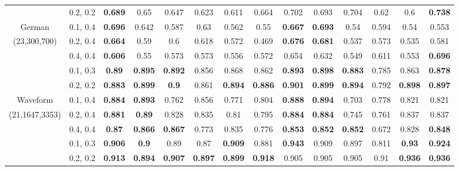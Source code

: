 \begin{table}[ht]
\begin{tabular}{|c|c|c|c|c|c|c|c|c|c|c|c|c|c|}
               & 0.2, 0.2   & \textbf{0.689} & 0.65      & 0.647     & 0.623 & 0.611 & 0.664 
               & 0.702 & 0.693     & 0.704     & 0.62  & 0.6   & \textbf{0.738} \\
German         & 0.1, 0.4   & \textbf{0.696} & 0.642     & 0.587     & 0.63  & 0.562 & 0.55  
               & \textbf{0.667} & \textbf{0.693}     & 0.54      & 0.594 & 0.54  & 0.553 \\
(23,300,700)   & 0.2, 0.4   & \textbf{0.664} & 0.59      & 0.6       & 0.618 & 0.572 & 0.469 
               & \textbf{0.676} & \textbf{0.681}     & 0.537     & 0.573 & 0.535 & 0.581 \\
               & 0.4, 0.4   & \textbf{0.606} & 0.55      & 0.573     & 0.573 & 0.556 & 0.572 
               & 0.654 & 0.632     & 0.549     & 0.611 & 0.553 & \textbf{0.696} \\ \hline
               & 0.1, 0.3   & \textbf{0.89}  & \textbf{0.895}     & \textbf{0.892}     & 0.856 & 0.868 & 0.862 
               & \textbf{0.893} & \textbf{0.898}     & \textbf{0.883}     & 0.785 & 0.863 & \textbf{0.878} \\ 
               & 0.2, 0.2   & \textbf{0.883} & \textbf{0.899}     & \textbf{0.9}       & 0.861 & \textbf{0.894} & \textbf{0.886} 
               & \textbf{0.901} & \textbf{0.899}     & \textbf{0.894}     & 0.792 & \textbf{0.898} & \textbf{0.897} \\
Waveform       & 0.1, 0.4   & \textbf{0.884} & \textbf{0.893}     & 0.762     & 0.856 & 0.771 & 0.804 
               & \textbf{0.888} & \textbf{0.894}     & 0.703     & 0.778 & 0.821 & 0.821 \\
(21,1647,3353) & 0.2, 0.4   & \textbf{0.881} & \textbf{0.89}      & 0.828     & 0.835 & 0.81  & 0.795 
               & \textbf{0.884} & \textbf{0.884}     & 0.745     & 0.761 & 0.837 & 0.837 \\
               & 0.4, 0.4   & \textbf{0.87}  & \textbf{0.866}     & \textbf{0.867}     & 0.773 & 0.835 & 0.776 
               & \textbf{0.853} & \textbf{0.852}     & \textbf{0.852}     & 0.672 & 0.828 & \textbf{0.848} \\ \hline
               & 0.1, 0.3   & \textbf{0.906} & \textbf{0.9}       & 0.89      & 0.87  & \textbf{0.909} & 0.881 
               & \textbf{0.943} & 0.909     & 0.897     & 0.811 & \textbf{0.93}  & \textbf{0.924} \\ 
               & 0.2, 0.2   & \textbf{0.913} & \textbf{0.894}     & \textbf{0.907}     & \textbf{0.897} & \textbf{0.899} & \textbf{0.918 }
               & 0.905 & 0.905     & 0.905     & 0.91  & \textbf{0.936} & \textbf{0.936} \\

\end{tabular}
\end{table}
